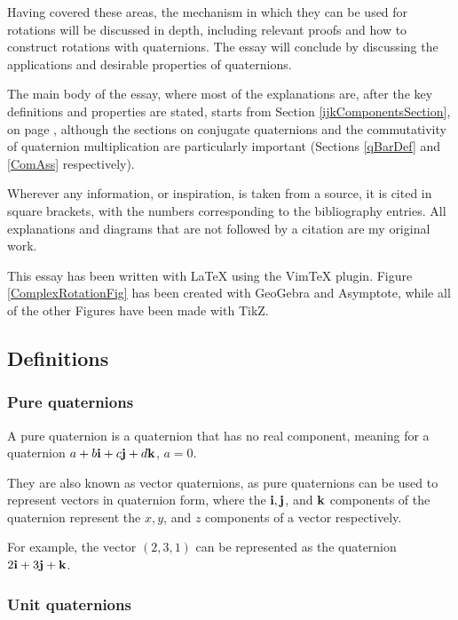 \documentclass[10pt]{article}
\begin{document}
Having covered these areas, the mechanism in which they can be used for rotations will be discussed in depth, including relevant proofs and how to construct rotations with quaternions. The essay will conclude by discussing the applications and desirable properties of quaternions.

The main body of the essay, where most of the explanations are, after the key definitions and properties are stated, starts from Section \ref{ijkComponentsSection}, on page \pageref{ijkComponentsSection}, although the sections on conjugate quaternions and the commutativity of quaternion multiplication are particularly important (Sections \ref{qBarDef} and \ref{ComAss} respectively).

Wherever any information, or inspiration, is taken from a source, it is cited in square brackets, with the numbers corresponding to the bibliography entries. All explanations and diagrams that are not followed by a citation are my original work.

This essay has been written with \LaTeX{} using the VimTeX plugin. Figure \ref{ComplexRotationFig} has been created with GeoGebra and Asymptote, while all of the other Figures have been made with TikZ.

\subsection{Definitions}

\subsubsection{Pure quaternions} \label{PureDef}

A pure quaternion is a quaternion that has no real component, meaning for a quaternion $a + b\vb{i} + c\vb{j} + d\vb{k}$, $a = 0$. \cite{Math431}

They are also known as vector quaternions, as pure quaternions can be used to represent vectors in quaternion form, where the $\vb{i, j}$, and $\vb{k}$ components of the quaternion represent the $x, y$, and $z$ components of a vector respectively.

For example, the vector $(2,3,1)$ can be represented as the quaternion $2\vb{i} + 3\vb{j} + \vb{k}$.

\subsubsection{Unit quaternions}
\end{document}
